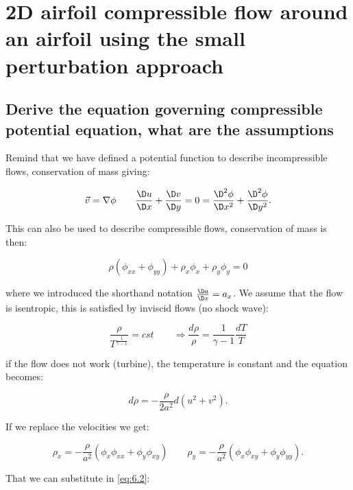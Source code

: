 \documentclass[british,french,11pt, a4paper, openany]{article}
\begin{document}
\section{2D airfoil compressible flow around an airfoil using the small perturbation approach}

\subsection{Derive the equation governing compressible potential equation, what are the assumptions}

Remind that we have defined a potential function to describe incompressible flows, conservation of mass giving:

\begin{equation}
\vec{v} = \nabla \phi \qquad \frac{\D u}{\D x} + \frac{\D v}{\D y} = 0 = \frac{\D^2 \phi}{\D x^2} + \frac{\D^2 \phi}{\D y^2}.
\end{equation}

This can also be used to describe compressible flows, conservation of mass is then: 

\begin{equation}
\rho (\phi _{xx} + \phi _{yy}) + \rho _x \phi _x + \rho _y \phi _y = 0
\label{eq:6.2}
\end{equation}

where we introduced the shorthand notation $\frac{\D a}{\D x} = a_x$. We assume that the flow is isentropic, this is satisfied by inviscid flows (no shock  wave): 

\begin{equation}
\frac{\rho}{T^{\frac{1}{\gamma -1}}} = cst \qquad \Rightarrow \frac{d \rho}{\rho} = \frac{1}{\gamma -1} \frac{dT}{T}
\end{equation}

if the flow does not work (turbine), the temperature is constant and the equation becomes:

\begin{equation}
d\rho = -\frac{\rho}{2a^2} d(u^2+v^2).
\end{equation}

If we replace the velocities we get: 

\begin{equation}
\rho _x = -\frac{\rho}{a^2} (\phi _x \phi _{xx} + \phi _y \phi _{xy}) \qquad \rho _y = -\frac{\rho}{a^2} (\phi _x \phi _{xy} + \phi _y \phi _{yy}).
\end{equation}		

That we can substitute in \eqref{eq:6.2}:
\end{document}
